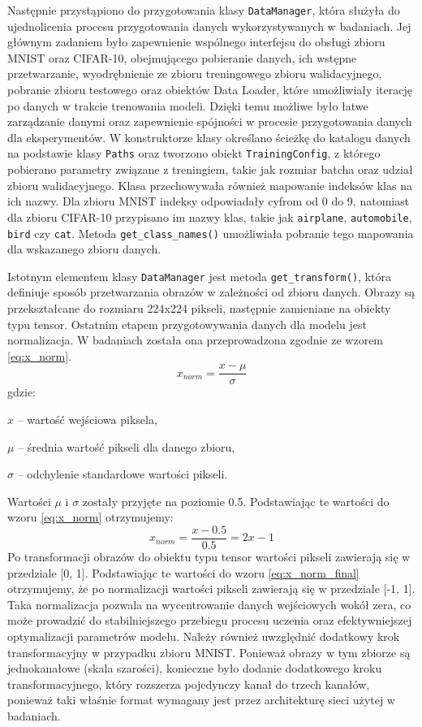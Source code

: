 Następnie przystąpiono do przygotowania klasy \texttt{DataManager}, która służyła do ujednolicenia procesu przygotowania danych wykorzystywanych w badaniach. Jej głównym zadaniem było zapewnienie wspólnego interfejsu do obsługi zbioru MNIST oraz CIFAR-10, obejmującego pobieranie danych, ich wstępne przetwarzanie, wyodrębnienie ze zbioru treningowego zbioru walidacyjnego, pobranie zbioru testowego oraz obiektów Data Loader, które umożliwiały iterację po danych w trakcie trenowania modeli. Dzięki temu możliwe było łatwe zarządzanie danymi oraz zapewnienie spójności w procesie przygotowania danych dla eksperymentów.
W konstruktorze klasy określano ścieżkę do katalogu danych na podstawie klasy \texttt{Paths} oraz tworzono obiekt \texttt{TrainingConfig}, z którego pobierano parametry związane z treningiem, takie jak rozmiar batcha oraz udział zbioru walidacyjnego. Klasa przechowywała również mapowanie indeksów klas na ich nazwy. Dla zbioru MNIST indeksy odpowiadały cyfrom od 0 do 9, natomiast dla zbioru CIFAR-10 przypisano im nazwy klas, takie jak \texttt{airplane}, \texttt{automobile}, \texttt{bird} czy \texttt{cat}. Metoda \texttt{get\_class\_names()} umożliwiała pobranie tego mapowania dla wskazanego zbioru danych.

Istotnym elementem klasy \texttt{DataManager} jest metoda \texttt{get\_transform()}, która definiuje sposób przetwarzania obrazów w zależności od zbioru danych. Obrazy są przekształcane do rozmiaru 224x224 pikseli, następnie zamieniane na obiekty typu tensor. Ostatnim etapem przygotowywania danych dla modelu jest normalizacja. W badaniach została ona przeprowadzona zgodnie ze wzorem \ref{eq:x_norm}. 
\begin{equation} \label{eq:x_norm}
    x_{norm} = \frac{x - \mu}{\sigma}
\end{equation}
gdzie:
\begin{description}
    \item $x$ -- wartość wejściowa piksela,
    \item $\mu$ -- średnia wartość pikseli dla danego zbioru,
    \item $\sigma$ -- odchylenie standardowe wartości pikseli.
\end{description}
Wartości $\mu$ i $\sigma$ zostały przyjęte na poziomie 0.5. Podstawiając te wartości do wzoru \ref{eq:x_norm} otrzymujemy:
\begin{equation} \label{eq:x_norm_final}
    x_{norm} = \frac{x - 0.5}{0.5} = 2x - 1
\end{equation} 
Po transformacji obrazów do obiektu typu tensor wartości pikseli zawierają się w przedziale [0, 1]. Podstawiając te wartości do wzoru \ref{eq:x_norm_final} otrzymujemy, że po normalizacji wartości pikseli zawierają się w przedziale [-1, 1]. Taka normalizacja pozwala na wycentrowanie danych wejściowych wokół zera, co może prowadzić do stabilniejszego przebiegu procesu uczenia oraz efektywniejszej optymalizacji parametrów modelu. Należy również uwzględnić dodatkowy krok transformacyjny w przypadku zbioru MNIST. Ponieważ obrazy w tym zbiorze są jednokanałowe (skala szarości), konieczne było dodanie dodatkowego kroku transformacyjnego, który rozszerza pojedynczy kanał do trzech kanałów, ponieważ taki właśnie format wymagany jest przez architekturę sieci użytej w badaniach.

